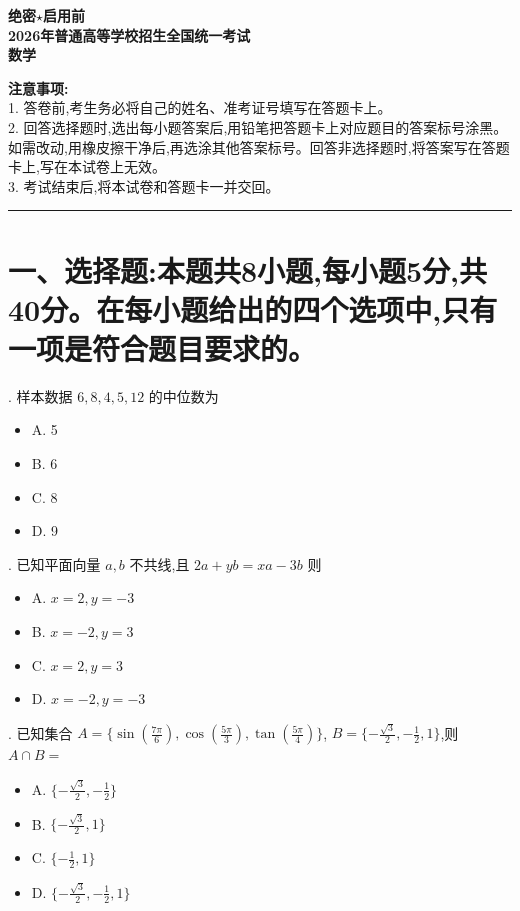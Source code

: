 \documentclass[UTF8, a4paper, 11pt]{ctexart}
\begin{document}
\begin{center}
    \textbf{绝密$\star$启用前}\\
    \vspace{0.5em}
    \Large \textbf{2026年普通高等学校招生全国统一考试}\\
    \vspace{0.5em}
    \Huge \textbf{数学}
\end{center}

\vspace{1em}

\noindent \textbf{注意事项:}\\
1. 答卷前,考生务必将自己的姓名、准考证号填写在答题卡上。\\
2. 回答选择题时,选出每小题答案后,用铅笔把答题卡上对应题目的答案标号涂黑。 如需改动,用橡皮擦干净后,再选涂其他答案标号。回答非选择题时,将答案写在答题卡上,写在本试卷上无效。\\
3. 考试结束后,将本试卷和答题卡一并交回。

\vspace{1em}
\hrule
\vspace{1em}

\section*{一、选择题:本题共8小题,每小题5分,共40分。在每小题给出的四个选项中,只有一项是符合题目要求的。}

. 样本数据 $6,8,4,5,12$ 的中位数为
\begin{itemize}
    \item A. 5
    \item B. 6
    \item C. 8
    \item D. 9
\end{itemize}

. 已知平面向量 $a,b$ 不共线,且 $2a+yb=xa-3b$ 则
\begin{itemize}
    \item A. $x=2,y=-3$
    \item B. $x=-2,y=3$
    \item C. $x=2,y=3$
    \item D. $x=-2,y=-3$
\end{itemize}

. 已知集合 $A=\{\sin(\frac{7\pi}{6}),\cos(\frac{5\pi}{3}),\tan(\frac{5\pi}{4})\}$, $B=\{-\frac{\sqrt{3}}{2},-\frac{1}{2},1\}$,则 $A\cap B=$
\begin{itemize}
    \item A. $\{-\frac{\sqrt{3}}{2},-\frac{1}{2}\}$
    \item B. $\{-\frac{\sqrt{3}}{2},1\}$
    \item C. $\{-\frac{1}{2},1\}$
    \item D. $\{-\frac{\sqrt{3}}{2},-\frac{1}{2},1\}$
\end{itemize}
\end{document}
